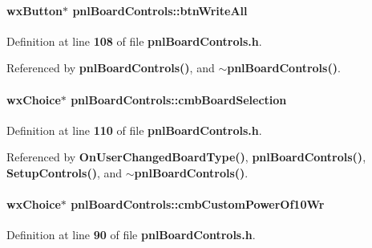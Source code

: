 \paragraph[{btn\+Write\+All}]{\setlength{\rightskip}{0pt plus 5cm}wx\+Button$\ast$ pnl\+Board\+Controls\+::btn\+Write\+All\hspace{0.3cm}{\ttfamily [protected]}}\label{classpnlBoardControls_a225e62df2feb7970f351e835a89811bb}


Definition at line {\bf 108} of file {\bf pnl\+Board\+Controls.\+h}.



Referenced by {\bf pnl\+Board\+Controls()}, and {\bf $\sim$pnl\+Board\+Controls()}.

\paragraph[{cmb\+Board\+Selection}]{\setlength{\rightskip}{0pt plus 5cm}wx\+Choice$\ast$ pnl\+Board\+Controls\+::cmb\+Board\+Selection\hspace{0.3cm}{\ttfamily [protected]}}\label{classpnlBoardControls_affb505a35fdd93c8d8cfb5fa79da83a7}


Definition at line {\bf 110} of file {\bf pnl\+Board\+Controls.\+h}.



Referenced by {\bf On\+User\+Changed\+Board\+Type()}, {\bf pnl\+Board\+Controls()}, {\bf Setup\+Controls()}, and {\bf $\sim$pnl\+Board\+Controls()}.

\paragraph[{cmb\+Custom\+Power\+Of10\+Wr}]{\setlength{\rightskip}{0pt plus 5cm}wx\+Choice$\ast$ pnl\+Board\+Controls\+::cmb\+Custom\+Power\+Of10\+Wr\hspace{0.3cm}{\ttfamily [protected]}}\label{classpnlBoardControls_a22a07c1c7279121fbca81dec9884f0ce}


Definition at line {\bf 90} of file {\bf pnl\+Board\+Controls.\+h}.



